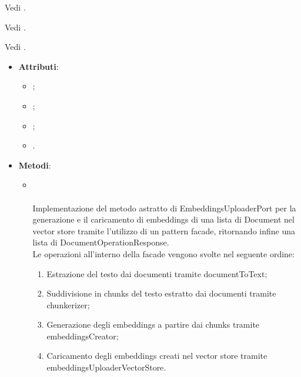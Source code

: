 \documentclass[10pt, a4paper]{article}
\begin{document}
Vedi .

Vedi .

Vedi .

\label{EmbeddingsUploaderFacadeLangchainDettaglio}
\begin{itemize}
    \item \textbf{Attributi}:
    \begin{itemize}
        \item {};
        \item {};
        \item {};
        \item {}.
    \end{itemize}
    \item \textbf{Metodi}:
    \begin{itemize}
        \item {}\\ \\
        Implementazione del metodo astratto di EmbeddingsUploaderPort per la generazione e il caricamento di embeddings di una lista di Document nel vector store tramite l'utilizzo di un pattern facade, ritornando infine una lista di DocumentOperationResponse.\\
        Le operazioni all'interno della facade vengono svolte nel seguente ordine:
        \begin{enumerate}
            \item Estrazione del testo dai documenti tramite documentToText;
            \item Suddivisione in chunks del testo estratto dai documenti tramite chunkerizer;
            \item Generazione degli embeddings a partire dai chunks tramite embeddingsCreator;
            \item Caricamento degli embeddings creati nel vector store tramite embeddingsUploaderVectorStore.
        \end{enumerate}
    \end{itemize}
\end{itemize}
\end{document}
